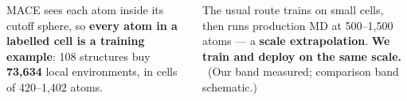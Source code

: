 \documentclass[17pt, a0paper, portrait,
  margin=15mm, innermargin=12mm,
  blockverticalspace=7mm, colspace=14mm, subcolspace=7mm]{tikzposter}
\begin{document}
\begin{columns}
{\begin{minipage}[t]{0.345\linewidth}
    \par\vspace{3mm}\raggedright
    MACE sees each atom inside its cutoff sphere, so \textbf{every atom in a labelled cell is
    a training example}: 108 structures buy \textbf{73{,}634} local environments, in cells of
    420--1{,}402 atoms.
    \par\vspace{3mm}
    The usual route trains on small cells, then runs production MD at 500--1{,}500 atoms ---
    a \textbf{scale extrapolation}. \textbf{We train and deploy on the same scale.}
    {\small\textcolor{herodim}{\ (Our band measured; comparison band schematic.)}}
  \end{minipage}
}
\end{columns}
\end{document}
